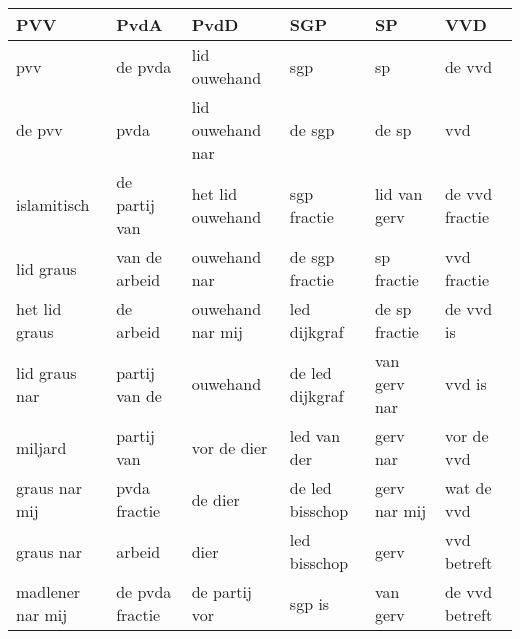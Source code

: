 \begin{tabular}{llllll}
\toprule
              PVV &             PvdA &              PvdD &              SGP &             SP &             VVD \\
\midrule
              pvv &          de pvda &      lid ouwehand &              sgp &             sp &          de vvd \\
           de pvv &             pvda &  lid ouwehand nar &           de sgp &          de sp &             vvd \\
      islamitisch &    de partij van &  het lid ouwehand &      sgp fractie &   lid van gerv &  de vvd fractie \\
        lid graus &    van de arbeid &      ouwehand nar &   de sgp fractie &     sp fractie &     vvd fractie \\
    het lid graus &        de arbeid &  ouwehand nar mij &     led dijkgraf &  de sp fractie &       de vvd is \\
    lid graus nar &    partij van de &          ouwehand &  de led dijkgraf &   van gerv nar &          vvd is \\
          miljard &       partij van &       vor de dier &      led van der &       gerv nar &      vor de vvd \\
    graus nar mij &     pvda fractie &           de dier &  de led bisschop &   gerv nar mij &      wat de vvd \\
        graus nar &           arbeid &              dier &     led bisschop &           gerv &     vvd betreft \\
 madlener nar mij &  de pvda fractie &     de partij vor &           sgp is &       van gerv &  de vvd betreft \\
\bottomrule
\end{tabular}
